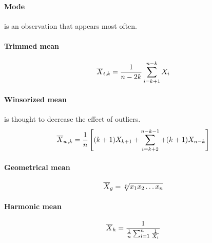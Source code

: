 \paragraph{Mode}
is an observation that appears most often.

\paragraph{Trimmed mean} \hspace{0pt}

\vspace{-5pt}
\begin{gather*}
\overline{X}_{t,k} = \frac{1}{n - 2k} \sum_{i=k+1}^{n-k} X_i
\end{gather*}

\paragraph{Winsorized mean}
is thought to decrease the effect of outliers.
\begin{gather*}
\overline{X}_{w,k} = \frac{1}{n} \left[ (k+1)X_{k+1} + \sum_{i=k+2}^{n-k-1} + (k+1)X_{n-k} \right]
\end{gather*}

\paragraph{Geometrical mean}

\[ \overline{X}_g = \sqrt[n]{x_1 x_2 \ldots x_n} \]

\paragraph{Harmonic mean} \hspace{0pt}

\vspace{-10pt}
\[ \overline{X}_h = \frac{1}{ \frac{1}{n} \sum_{i=1}^n \frac{1}{X_i} } \]
